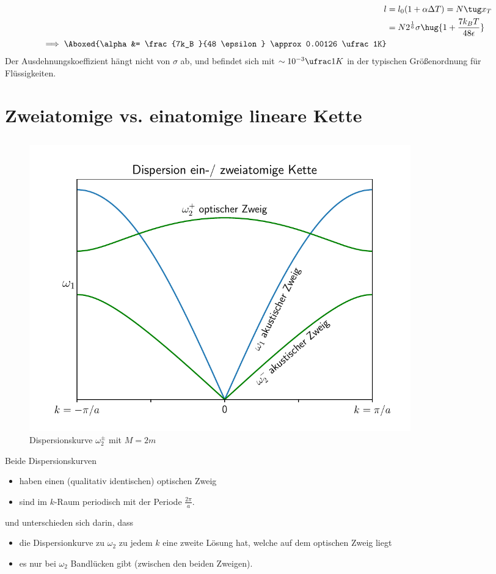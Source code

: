 \documentclass[exa]{exercise_5.0}
\begin{document}
\subsection{}
\begin{align*}
    l &= l_0 (1+\alpha \Delta T)= N\tug x_T\\
    &= N 2^\frac16 \sigma\hug{1+ \frac{7k_B T}{48\epsilon}}\\
    \implies \Aboxed{\alpha &= \frac{7k_B }{48 \epsilon} \approx 0.00126 \ufrac 1K}
\end{align*}
Der Ausdehnungskoeffizient hängt nicht von $\sigma$ ab, und befindet sich mit $\sim10^{-3} \ufrac 1K$ in der typischen Größenordnung für Flüssigkeiten. 

\section{Zweiatomige vs. einatomige lineare Kette}
\subsection{}
\begin{figure}[H]
    \centering
    \includegraphics[width=0.8\textwidth]{dispersion.pdf}
    \caption{Dispersionskurve $\omega_2^\pm$ mit $M=2m$}
\end{figure}
Beide Dispersionskurven 
\begin{itemize}
    \item haben einen (qualitativ identischen) optischen Zweig 
    \item sind im $k$-Raum periodisch mit der Periode $\frac{2\pi}a$.
\end{itemize}
und unterschieden sich darin, dass 
\begin{itemize}
    \item die Dispersionkurve zu $\omega_2$ zu jedem $k$ eine zweite Lösung hat, welche auf dem optischen Zweig liegt
    \item es nur bei $\omega_2$ Bandlücken gibt (zwischen den beiden Zweigen).
\end{itemize}
\end{document}

